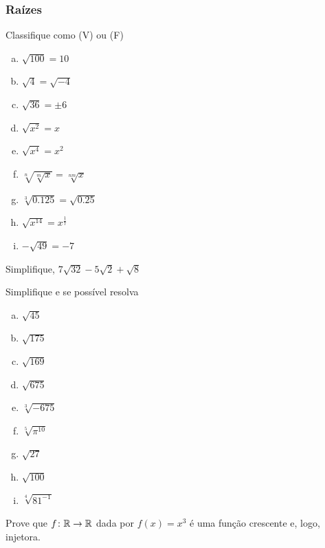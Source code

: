 \subsubsection{Raízes}
\begin{exer}Classifique como (V) ou (F) \begin{enumerate}[a)]
\item $\sqrt{100}=10$
\item $\sqrt{4} = \sqrt{-4}$
\item $\sqrt{36} = \pm 6$
\item $\sqrt{x^2} = x$
\item $\sqrt{x^4}=x^2$
\item $\sqrt[n]{\sqrt[m]{x}}=\sqrt[nm]{x}$
\item $\sqrt[3]{0.125} = \sqrt{0.25}$
\item $\sqrt{x^14} =x^\frac{1}{7}$
\item $-\sqrt{49}=-7$
\end{enumerate}
\end{exer}
\begin{exer}Simplifique, $7\sqrt{32} - 5\sqrt{2} +\sqrt{8}$
\end{exer}
\begin{exer} Simplifique e se possível resolva
\begin{enumerate}[a)]
\item $\sqrt{45}$
\item $\sqrt{175}$
\item $\sqrt{169}$
\item $\sqrt{675}$
\item $\sqrt[3]{-675}$
\item $\sqrt[5]{\pi^{10}}$
\item $\sqrt{27}$
\item $\sqrt{100}$
\item $\sqrt[4]{81^{-1}}$
\end{enumerate}
\end{exer}

\begin{exer} Prove que $f \colon \mathbb{R} \to \mathbb{R}$ dada por $f(x)=x^3$ é uma função crescente e, logo, injetora.
\end{exer}


